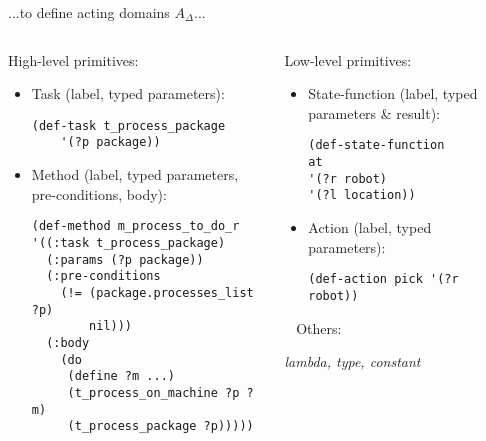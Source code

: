 \begin{frame}[fragile]{...to define acting domains $A_\Delta$...}
    \setlength{\leftmargini}{0pt}
    \begin{columns}
        \begin{column}{0.5\textwidth}
            High-level primitives:
            \begin{itemize}
                \footnotesize
                \item Task (label, typed parameters):
                \tiny
                \begin{lstlisting}
(def-task t_process_package
    '(?p package))
                \end{lstlisting}
                \footnotesize
                \pause
                \item Method (label, typed parameters, pre-conditions, body):
                \tiny
                \begin{lstlisting}
(def-method m_process_to_do_r
'((:task t_process_package)
  (:params (?p package))
  (:pre-conditions
    (!= (package.processes_list ?p)
        nil)))
  (:body
    (do
     (define ?m ...)
     (t_process_on_machine ?p ?m)
     (t_process_package ?p)))))    
                \end{lstlisting}
            \end{itemize}
        \end{column}
\pause
        \begin{column}{0.5\textwidth}
            Low-level primitives:
            \begin{itemize}
                \pause
            \footnotesize
            \item State-function (label, typed parameters \& result):
            \tiny
            \begin{lstlisting}
(def-state-function
at
'(?r robot)
'(?l location))
            \end{lstlisting}
            \pause
            \footnotesize
            \item Action (label, typed parameters):
            \tiny
            \begin{lstlisting}
(def-action pick '(?r robot))
                \end{lstlisting}
            \end{itemize}

            ~
        \normalsize
        Others:
        
        \textit{lambda, type, constant}
        \end{column}

        

    \end{columns}
    

\end{frame}



